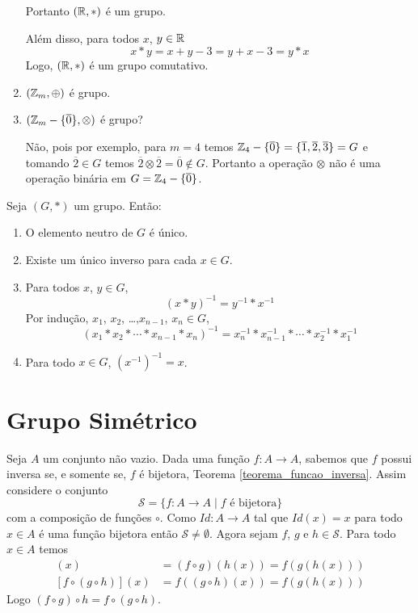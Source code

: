 \begin{exemplos}
\begin{enumerate}[label={\arabic*})]
\begin{solucao}
            Portanto $(\mathbb{R}, *)$ é um grupo.

            Além disso, para todos $x$, $y \in \mathbb{R}$
            \[
                x*y = x + y - 3 = y + x - 3 = y*x
            \]
            Logo, $(\mathbb{R}, *)$ é um grupo comutativo.
        \end{solucao}

        \item $(\mathbb{Z}_m,\oplus)$ é grupo.

        \item $(\mathbb{Z}_m-\{\overline{0}\},\otimes)$ é grupo?
        \begin{solucao}
            Não, pois por exemplo, para $m = 4$ temos $\mathbb{Z}_4-\{\overline{0}\} = \{\overline{1}, \overline{2}, \overline{3}\} = G$ e tomando $\overline{2}\in G$ temos $\overline{2} \otimes \overline{2} = \overline{0} \notin G$. Portanto a operação $\otimes$ não é uma operação binária em $G = \mathbb{Z}_4 - \{\overline{0}\}$.
        \end{solucao}
    \end{enumerate}
\end{exemplos}

\begin{proposicao}
    Seja $(G,*)$ um grupo. Então:
    \begin{enumerate}[label={\roman*})]
        \item O elemento neutro de $G$ é único.

        \item Existe um único inverso para cada $x \in G$.

        \item Para todos $x$, $y \in G$,
        \[
            (x*y)^{-1} = y^{-1}*x^{-1}
        \]
        Por indução, $x_1$, $x_2$, \dots ,$x_{n-1}$, $x_n \in G$,
        \[
            (x_1*x_2*\cdots *x_{n-1}*x_{n})^{-1} = x^{-1}_{n}*x^{-1}_{n-1}*\cdots *x^{-1}_2*x^{-1}_1
        \]
        \item Para todo $x \in G$, $(x^{-1})^{-1} = x$.
    \end{enumerate}
\end{proposicao}


\section{Grupo Simétrico} %
\label{sec:grupo_simétrico}

Seja $A$ um conjunto não vazio. Dada uma função $f : A \to A$, sabemos que $f$ possui inversa se, e somente se, $f$ é bijetora, Teorema \ref{teorema_funcao_inversa}. Assim considere o conjunto
\[
    \mathcal{S} = \{ f : A \to A \mid f \mbox{ é bijetora}\}
\]
com a composição de funções $\circ$. Como $Id : A \to A$ tal que $Id(x) = x$ para todo $x \in A$ é uma função bijetora então $\mathcal{S} \ne \emptyset$. Agora sejam $f$, $g$ e $h \in \mathcal{S}$. Para todo $x \in A$ temos
\begin{align*}
    [(f\circ g)\circ h](x) &= (f \circ g)(h(x)) = f(g(h(x)))\\
    [f\circ(g\circ h)](x) &= f((g\circ h)(x)) = f(g(h(x)))
\end{align*}
Logo $(f\circ g)\circ h = f\circ(g\circ h)$.

